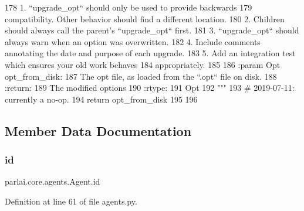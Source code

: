\begin{DoxyCode}
178 \textcolor{stringliteral}{            1. ``upgrade\_opt`` should only be used to provide backwards}
179 \textcolor{stringliteral}{            compatibility.  Other behavior should find a different location.}
180 \textcolor{stringliteral}{            2. Children should always call the parent's ``upgrade\_opt`` first.}
181 \textcolor{stringliteral}{            3. ``upgrade\_opt`` should always warn when an option was overwritten.}
182 \textcolor{stringliteral}{            4. Include comments annotating the date and purpose of each upgrade.}
183 \textcolor{stringliteral}{            5. Add an integration test which ensures your old work behaves}
184 \textcolor{stringliteral}{            appropriately.}
185 \textcolor{stringliteral}{}
186 \textcolor{stringliteral}{        :param Opt opt\_from\_disk:}
187 \textcolor{stringliteral}{            The opt file, as loaded from the ``.opt`` file on disk.}
188 \textcolor{stringliteral}{        :return:}
189 \textcolor{stringliteral}{            The modified options}
190 \textcolor{stringliteral}{        :rtype:}
191 \textcolor{stringliteral}{            Opt}
192 \textcolor{stringliteral}{        """}
193         \textcolor{comment}{# 2019-07-11: currently a no-op.}
194         \textcolor{keywordflow}{return} opt\_from\_disk
195 
196 
\end{DoxyCode}


\subsection{Member Data Documentation}
\mbox{\label{classparlai_1_1core_1_1agents_1_1Agent_ac00c13f4c7dd1263bf9203fa96dd2366}} 
\subsubsection{\texorpdfstring{id}{id}}
{\footnotesize\ttfamily parlai.\+core.\+agents.\+Agent.\+id}



Definition at line 61 of file agents.\+py.

\mbox{\label{classparlai_1_1core_1_1agents_1_1Agent_aedbecc4b4aa7af7413882a0429e0f1db}} 
